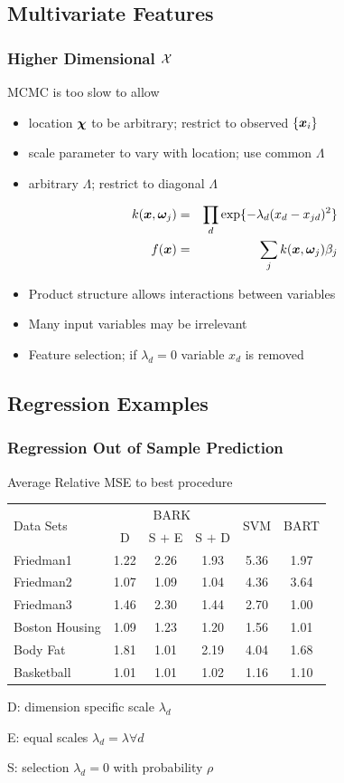 \documentclass[dvips]{beamer}
\newcommand{\bs}[2]{\begin{frame} \frametitle{#1} 
{#2}
\end{frame} }
\begin{document}
\subsection{Multivariate Features} 
\bs{Higher Dimensional $\mathcal{X}$} {

MCMC is too slow to allow
\begin{itemize}
\item location $\bm \chi$ to be arbitrary; restrict to observed $\{\bm x_i\}$
\item scale parameter to vary with location; use common $\Lambda$
\item arbitrary $\Lambda$; restrict to diagonal $\Lambda$
\end{itemize}
\begin{eqnarray*}
k(\bm x, \bm \omega_j) & = & \prod_d \exp\{ -\lambda_d (x_d - x_{jd})^2
\} \\  
f(\bm x) & =  & \sum_j k(\bm x, \bm \omega_j) \beta_j
\end{eqnarray*}


\begin{itemize}
\item Product structure allows interactions between variables
\item Many input variables may be irrelevant
\item Feature selection; if $\lambda_d = 0$ variable $x_d$ is removed
\end{itemize}

}
\subsection{Regression Examples}
\bs{Regression Out of Sample Prediction} {
Average Relative MSE to best procedure
\small{
  \begin{tabular}[ht]{|l|c|c|c|c|c|}
    \hline
  \multirow{2}{*}{Data Sets} & 
  \multicolumn{3}{c|}{BARK} &
  \multirow{2}{*}{SVM}&
  \multirow{2}{*}{BART} \\ 
  \cline{2-4}
  &  D 
  & S $+$ E & S $+$ D && \\
    \hline
  Friedman1       %
  & 1.22 & 2.26 & 1.93 & 5.36 & 1.97 \\
  Friedman2       %
  & 1.07 & 1.09 & 1.04 & 4.36 & 3.64 \\
  Friedman3       %
  & 1.46 & 2.30 & 1.44 & 2.70 & 1.00 \\
  Boston Housing  %
  & 1.09 & 1.23 & 1.20 & 1.56 & 1.01 \\
  Body Fat        %
  & 1.81 & 1.01 & 2.19 & 4.04 & 1.68 \\
  Basketball      %
  & 1.01 & 1.01 & 1.02 & 1.16 & 1.10 \\\hline
  \end{tabular}
}

D: dimension specific scale $\lambda_d$

E: equal scales $\lambda_d = \lambda \forall d$ 

S: selection $\lambda_d = 0$ with probability $\rho$

}
\end{document}
